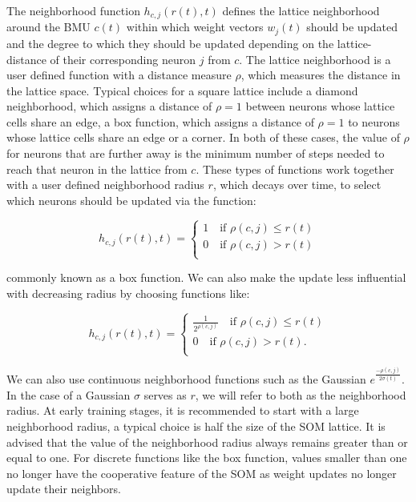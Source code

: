 The neighborhood function $h_{c,j}(r(t),t)$ defines the lattice neighborhood around the BMU $c(t)$ within which weight vectors $w_j(t)$ should be updated and the degree to which they should be updated depending on the lattice-distance of their corresponding neuron $j$ from $c$. 
The lattice neighborhood is a user defined function with a distance measure $\rho$, which measures the distance in the lattice space. Typical choices for a square lattice include a diamond neighborhood, which assigns a distance of $\rho = 1$ between neurons whose lattice cells share an edge, a box function, which assigns a distance of $\rho = 1$ to neurons whose lattice cells share an edge or a corner. In both of these cases, the value of $\rho$ for neurons that are further away is the minimum number of steps needed to reach that neuron in the lattice from $c$. These types of functions work together with a user defined neighborhood radius $r$, which decays over time, to select which neurons should be updated via the function:

\begin{equation}
    h_{c,j}(r(t),t) = \begin{cases}
        1 \quad \text{if } \rho(c,j) \leq r(t) \\
        0 \quad \text{if } \rho(c,j) > r(t) \\
    \end{cases}
    \label{eq:box_function}
\end{equation}

\noindent commonly known as a box function. We can also make the update less influential with decreasing radius by choosing functions like: 

\begin{equation}
    h_{c,j}(r(t),t) = \begin{cases}
    \frac{1}{2^{\rho(c,j)}} \quad \text{if } \rho(c,j) \leq r(t) \\
    0 \quad \text{if } \rho(c,j) > r(t) .\\
    \end{cases}
\end{equation}

We can also use continuous neighborhood functions such as the Gaussian $e^{\frac{-\rho(c,j)}{2\sigma(t)}}$. In the case of a Gaussian $\sigma$ serves as $r$, we will refer to both as the neighborhood radius.
At early training stages, it is recommended to start with a large neighborhood radius, a typical choice is half the size of the SOM lattice. It is advised that the value of the neighborhood radius always remains greater than or equal to one. For discrete functions like the box function, values smaller than one no longer have the cooperative feature of the SOM as weight updates no longer update their neighbors. 

